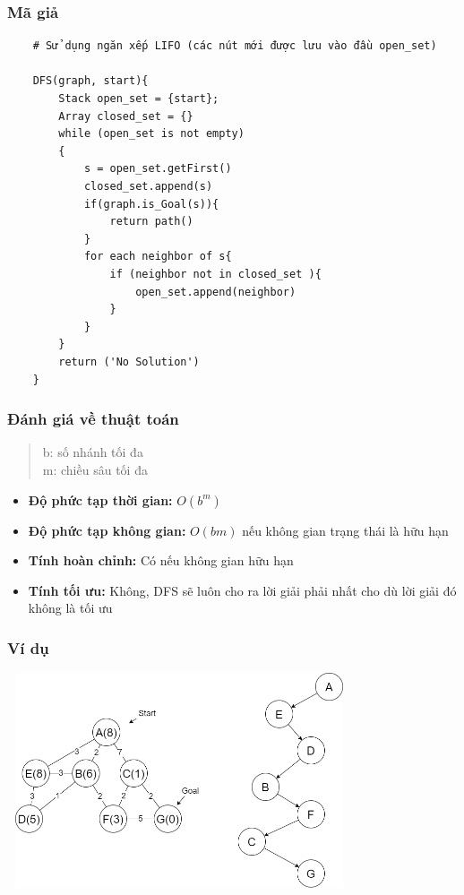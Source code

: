 \documentclass{article}
\begin{document}
\subsubsection{Mã giả}
\begin{verbatim}
    # Sử dụng ngăn xếp LIFO (các nút mới được lưu vào đầu open_set)
    
    DFS(graph, start){
        Stack open_set = {start};
        Array closed_set = {}
        while (open_set is not empty)
        {
            s = open_set.getFirst()
            closed_set.append(s)    
            if(graph.is_Goal(s)){
                return path()
            }
            for each neighbor of s{
                if (neighbor not in closed_set ){ 
                    open_set.append(neighbor)
                }   
            }
        } 
        return ('No Solution')
    }
\end{verbatim}

\subsubsection{Đánh giá về thuật toán}
\begin{quote}
    b: số nhánh tối đa\\
    m: chiều sâu tối đa
\end{quote}
\begin{itemize}
    \item \textbf{Độ phức tạp thời gian:} $O(b^m)$
    \item \textbf{Độ phức tạp không gian:} $O(bm)$ nếu không gian trạng thái là hữu hạn
    \item \textbf{Tính hoàn chỉnh:} Có nếu không gian hữu hạn
    \item \textbf{Tính tối ưu:} Không, DFS sẽ luôn cho ra lời giải phải nhất cho dù lời giải đó không là tối ưu
\end{itemize}
\subsubsection{Ví dụ}
    \centerline{\includegraphics[width=4in, height=2.5in]{image/dfs.png}}
    \vspace{2\baselineskip}
\end{document}
